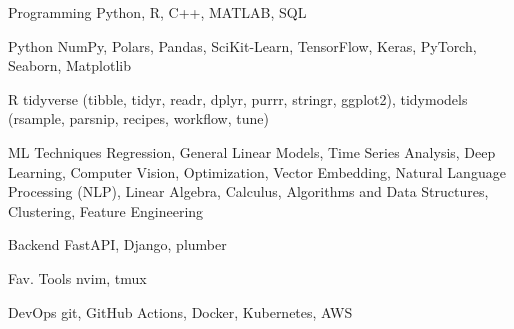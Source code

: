 

\begin{cvskills}

  \cvskill
    {Programming}
    {Python, R, C++, MATLAB, SQL}

  \cvskill
    {Python}
    {NumPy, Polars, Pandas,  SciKit-Learn, TensorFlow, Keras, PyTorch, Seaborn, Matplotlib}

  \cvskill
    {R}
    {tidyverse (tibble, tidyr, readr, dplyr, purrr, stringr, ggplot2), tidymodels (rsample, parsnip, recipes, workflow, tune)}

  \cvskill
    {ML Techniques}
    {Regression, General Linear Models, Time Series Analysis, Deep Learning, Computer Vision, Optimization, Vector Embedding, Natural Language Processing (NLP), Linear Algebra, Calculus, Algorithms and Data Structures, Clustering, Feature Engineering}

  \cvskill
    {Backend}
    {FastAPI, Django, plumber}

  \cvskill
    {Fav. Tools}
    {nvim, tmux}

  \cvskill
    {DevOps}
    {git, GitHub Actions, Docker, Kubernetes, AWS}

\end{cvskills}
